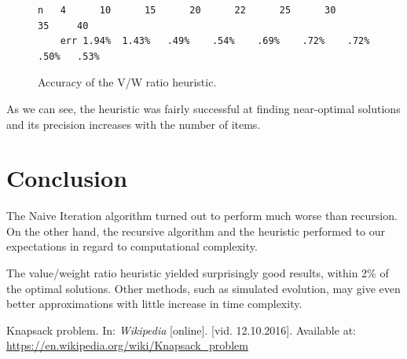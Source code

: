 \documentclass[a4paper,10pt,twocolumn]{article}
\begin{document}
\begin{figure}[H]
    \begin{lstlisting}[basicstyle=\scriptsize]
    n   4      10      15      20      22      25      30     35     40
    err 1.94%  1.43%   .49%    .54%    .69%    .72%    .72%   .50%   .53%
    \end{lstlisting}
    \caption{Accuracy of the V/W ratio heuristic.}\label{vwratioaccuracy}
\end{figure}

As we can see, the heuristic was fairly successful at finding near-optimal solutions and its precision increases with
the number of items.


\section{Conclusion} %
The Naive Iteration algorithm turned out to perform much worse than recursion. On the other hand, the recursive
algorithm and the heuristic performed to our expectations in regard to computational complexity.

The value/weight ratio heuristic yielded surprisingly good results, within 2\% of the optimal solutions. Other methods,
such as simulated evolution, may give even better approximations with little increase in time complexity.

\begin{thebibliography}{9}
        Knapsack problem.
        In: \textit {Wikipedia} [online].
        [vid. 12.10.2016]. Available at:
        \url{https://en.wikipedia.org/wiki/Knapsack_problem}
\end{thebibliography}
\end{document}
